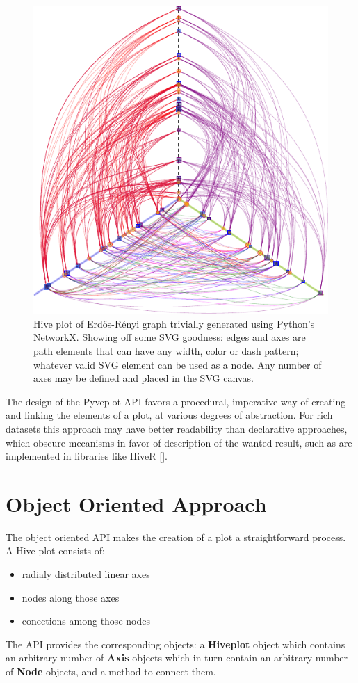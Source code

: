 \documentclass{bioinfo}
\begin{document}
\begin{figure}[th!]
  \centerline{\includegraphics[scale=0.8]{example.pdf}}
  \caption{Hive plot of Erd\"os-R\'enyi graph trivially generated
    using Python's NetworkX. Showing off some SVG goodness: edges and
    axes are path elements that can have any width, color or dash
    pattern; whatever valid SVG element can be used as a node. Any
    number of axes may be defined and placed in the SVG canvas.}
  \label{fig:01}
\end{figure}

The design of the Pyveplot API favors a procedural, imperative way of
creating and linking the elements of a plot, at various degrees of
abstraction. For rich datasets this approach may have better
readability than declarative approaches, which obscure mecanisms in
favor of description of the wanted result, such as are implemented in
libraries like HiveR [\cite{hiveR}].

\section{Object Oriented Approach}



The object oriented API makes the creation of a plot a straightforward
process. A Hive plot consists of:
\begin{itemize}
\item radialy distributed linear axes
\item nodes along those axes
\item conections among those nodes
\end{itemize}
The API provides the corresponding objects: a {\bfseries Hiveplot} object
which contains an arbitrary number of {\bfseries Axis} objects which in
turn contain an arbitrary number of {\bfseries Node} objects, and a method
to connect them.
\end{document}
